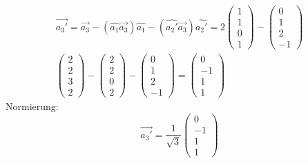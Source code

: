 \documentclass{article}
\begin{document}
\begin{eqnarray*}
    \vec{a_3'}=\vec{a_3}-(\hat{a_1}\vec{a_3})\hat{a_1}-(\hat{a_2'}\vec{a_3})\hat{a_2'} = 2\left(\begin{array}{c}1\\1\\0\\1\end{array}\right) - \left(\begin{array}{c}0\\1\\2\\-1\end{array}\right)\\
    \left(\begin{array}{c}2\\2\\3\\2\end{array}\right)-\left(\begin{array}{c}2\\2\\0\\2\end{array}\right)-\left(\begin{array}{c}0\\1\\2\\-1\end{array}\right) = \left(\begin{array}{c}0\\-1\\1\\1\end{array}\right)
\end{eqnarray*}
Normierung:
\begin{equation*}
    \vec{a_3'}=\frac{1}{\sqrt{3}}\left(\begin{array}{c}0\\-1\\1\\1\end{array}\right)
\end{equation*}
\end{document}
